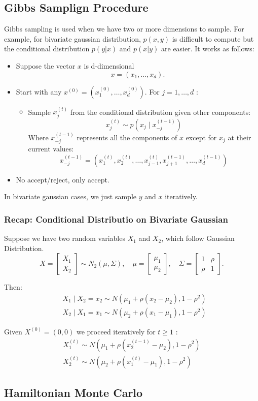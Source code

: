 \subsection{Gibbs Samplign Procedure}
Gibbs sampling is used when we have two or more dimensions to sample. For example, for bivariate gaussian distribution, $p(x,y)$ is difficult to compute but the conditional distribution $p(y|x)$ and $p(x|y)$ are easier. It works as follows:
\begin{itemize}
    \item Suppose the vector $x$ is d-dimensional
    $$
    x=\left(x_1, \ldots, x_d\right) .
    $$
    \item Start with any $x^{(0)}=\left(x_1^{(0)}, \ldots, x_d^{(0)}\right)$. For $j=1, \ldots, d$ :
    \begin{itemize}
        \item Sample $x_j^{(t)}$ from the conditional distribution given other components:
        $$
        x_j^{(t)} \sim p\left(x_j \mid x_{-j}^{(t-1)}\right)
        $$
        Where $x_{-j}^{(t-1)}$ represents all the components of $x$ except for $x_j$ at their current values:
        $$
        x_{-j}^{(t-1)}=\left(x_1^{(t)}, x_2^{(t)}, \ldots, x_{j-1}^{(t)}, x_{j+1}^{(t-1)}, \ldots, x_d^{(t-1)}\right)
        $$
    \end{itemize}
   
    \item No accept/reject, only accept.
\end{itemize}
In bivariate gaussian cases, we just sample $y$ and $x$ iteratively.
\subsubsection*{Recap: Conditional Distributio on Bivariate Gaussian}
Suppose we have two random variables $X_1$ and $X_2$, which follow Gaussian Distribution.
$$
X=\left[\begin{array}{l}
X_1 \\
X_2
\end{array}\right] \sim N_2(\mu, \Sigma), \quad \mu=\left[\begin{array}{l}
\mu_1 \\
\mu_2
\end{array}\right], \quad \Sigma=\left[\begin{array}{ll}
1 & \rho \\
\rho & 1
\end{array}\right] .
$$

Then:
$$
\begin{aligned}
& X_1 \mid X_2=x_2 \sim N\left(\mu_1+\rho\left(x_2-\mu_2\right), 1-\rho^2\right) \\
& X_2 \mid X_1=x_1 \sim N\left(\mu_2+\rho\left(x_1-\mu_1\right), 1-\rho^2\right)
\end{aligned}
$$

Given $X^{(0)}=(0,0)$ we proceed iteratively for $t \geq 1$ :
$$
\begin{gathered}
X_1^{(t)} \sim N\left(\mu_1+\rho\left(x_2^{(t-1)}-\mu_2\right), 1-\rho^2\right) \\
X_2^{(t)} \sim N\left(\mu_2+\rho\left(x_1^{(t)}-\mu_1\right), 1-\rho^2\right)
\end{gathered}
$$

\subsection{Hamiltonian Monte Carlo}
